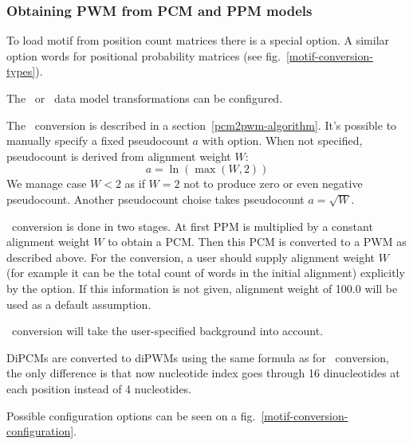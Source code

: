 \subsubsection{Obtaining PWM from PCM and PPM models}
To load motif from position count matrices there is a special  option.
A similar option  words for positional probability matrices (see fig.~\ref{motif-conversion-types}).

The \PcmToPwm\ or \PpmToPwm\ data model transformations can be configured.

The \PcmToPwm\ conversion is described in a section~\ref{pcm2pwm-algorithm}. It's possible to manually specify a fixed pseudocount $a$ with  option. When not specified, pseudocount is derived from alignment weight $W$:
$$a =\ln(\max(W,2))$$
We manage case $W<2$ as if $W=2$ not to produce zero or even negative pseudocount.
Another pseudocount choise  takes pseudocount $a=\sqrt{W}$.


\PpmToPwm\ conversion is done in two stages. At first PPM is multiplied by a constant alignment weight $W$ to obtain a PCM. Then this PCM is converted to a PWM as described above.
For the \PpmToPwm conversion, a user should supply alignment weight $W$ (for example it can be the total count of words in the initial alignment) explicitly by the  option. If this information is not given, alignment weight of 100.0 will be used as a default assumption.

\PcmToPwm\ conversion will take the user-specified background into account.

DiPCMs are converted to diPWMs using the same formula as for \PcmToPwm\ conversion, the only difference is that now nucleotide index goes through 16 dinucleotides at each position instead of 4 nucleotides.

Possible configuration options can be seen on a fig.~\ref{motif-conversion-configuration}.

